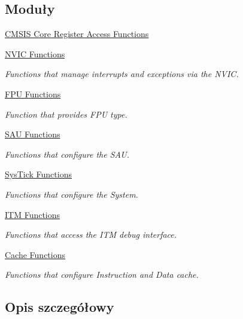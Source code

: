 \subsection*{Moduły}
\begin{DoxyCompactItemize}
\item 
\hyperlink{group___c_m_s_i_s___core___reg_acc_functions}{C\+M\+S\+I\+S Core Register Access Functions}
\item 
\hyperlink{group___c_m_s_i_s___core___n_v_i_c_functions}{N\+V\+I\+C Functions}
\begin{DoxyCompactList}\small\item\em Functions that manage interrupts and exceptions via the N\+V\+IC. \end{DoxyCompactList}\item 
\hyperlink{group___c_m_s_i_s___core___fpu_functions}{F\+P\+U Functions}
\begin{DoxyCompactList}\small\item\em Function that provides F\+PU type. \end{DoxyCompactList}\item 
\hyperlink{group___c_m_s_i_s___core___s_a_u_functions}{S\+A\+U Functions}
\begin{DoxyCompactList}\small\item\em Functions that configure the S\+AU. \end{DoxyCompactList}\item 
\hyperlink{group___c_m_s_i_s___core___sys_tick_functions}{Sys\+Tick Functions}
\begin{DoxyCompactList}\small\item\em Functions that configure the System. \end{DoxyCompactList}\item 
\hyperlink{group___c_m_s_i_s__core___debug_functions}{I\+T\+M Functions}
\begin{DoxyCompactList}\small\item\em Functions that access the I\+TM debug interface. \end{DoxyCompactList}\item 
\hyperlink{group___c_m_s_i_s___core___cache_functions}{Cache Functions}
\begin{DoxyCompactList}\small\item\em Functions that configure Instruction and Data cache. \end{DoxyCompactList}\end{DoxyCompactItemize}


\subsection{Opis szczegółowy}

